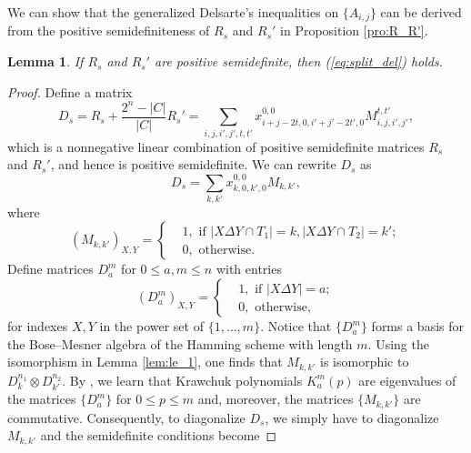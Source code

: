 \documentclass[final,onecolumn]{IEEEtran}
\newtheorem{lemmaenv}[definitionenv]{Lemma}
\newenvironment{lemma}{\begin{lemmaenv}\rm}{\end{lemmaenv}}
\theoremstyle{definition}
\begin{document}
We can show that the generalized Delsarte's inequalities on $\{A_{i,j}\}$ can be derived from the positive semidefiniteness of $R_s$ and $R_s'$ in Proposition \ref{pro:R_R'}.

\begin{lemma}
If $R_s$ and $R_s'$ are positive semidefinite, then (\ref{eq:split_del}) holds.
\end{lemma}
	
\begin{proof}
	Define a matrix	
	\begin{equation*}
		D_{s} =  R_{s} + \frac{2^{n}-\lvert C \rvert}{\lvert C \rvert}R_{s}'= \sum_{i, j, i', j', t, t'} x_{i+j-2t, 0, i'+j'-2t', 0}^{0, 0} M_{i, j, i', j'}^{t, t'},
	\end{equation*}
	which   is a nonnegative linear combination of positive semidefinite matrices $R_{s}$ and $R_{s}'$, and hence is positive semidefinite. 
	We can rewrite $D_{s}$ as
	\begin{equation*}
		D_{s} = \sum_{k, k'} x_{k, 0, k', 0}^{0, 0} M_{k, k'},
	\end{equation*}
	where
	\begin{equation*}
		(M_{k, k'})_{X, Y} = \left\{
		\begin{aligned}
			&1, \text{ if } \lvert X \Delta Y \cap T_{1}\rvert = k, \lvert X \Delta Y \cap T_{2}\rvert = k';\\
			&0, \text{ otherwise.}
		\end{aligned} \right.
	\end{equation*}
	Define matrices $D_{a}^{m}$ for $0\leq a,m\leq n$ with entries
	\begin{equation*}
		(D_{a}^{m})_{X, Y} = \left\{
		\begin{aligned}
			&1, \text{ if } \lvert X \Delta Y\rvert = a;\\
			&0, \text{ otherwise,}
		\end{aligned}
		\right.
	\end{equation*}
	for indexes $X, Y$ in the power set of $\{1, \dots, m\}$. Notice that $\{D_{a}^{m}\}$ forms a basis for the Bose–Mesner algebra of the Hamming scheme with length $m$. Using the isomorphism in Lemma \ref{lem:le_1}, one finds that $M_{k, k'}$ is isomorphic to  $D_{k}^{n_{1}} \otimes D_{k'}^{n_{2}}$. By \cite{Del73}, we learn that Krawchuk polynomials $K_{a}^{m}(p)$ are eigenvalues of the matrices $\{D_{a}^{m}\}$ for $0 \leq p \leq m$ and, moreover, the matrices $\{M_{k, k'}\}$ are commutative. Consequently, to diagonalize $D_{s}$,  we  simply have to diagonalize $M_{k, k'}$ and the semidefinite conditions become

\end{proof}
\end{document}

